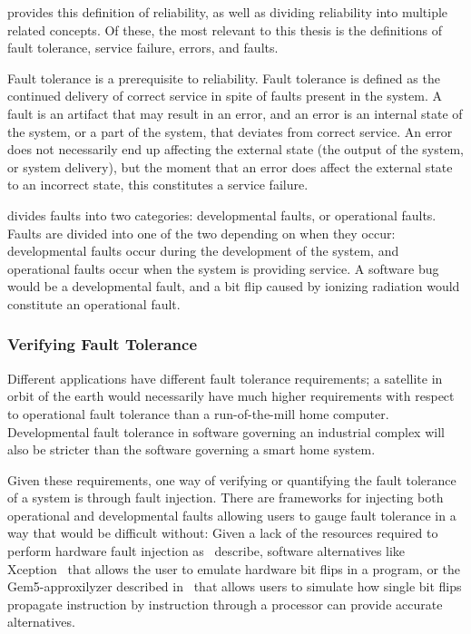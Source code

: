 \citet{avizienis2004basic} provides this definition of reliability, as well as dividing reliability into multiple related concepts. Of these, the most relevant to this thesis is the definitions of fault tolerance, service failure, errors, and faults.  

Fault tolerance is a prerequisite to reliability. Fault tolerance is defined as the continued delivery of correct service in spite of faults present in the system. A fault is an artifact that may result in an error, and an error is an internal state of the system, or a part of the system, that deviates from correct service. An error does not necessarily end up affecting the external state (the output of the system, or system delivery), but the moment that an error does affect the external state to an incorrect state, this constitutes a service failure.

\citet{avizienis2004basic} divides faults into two categories: developmental faults, or operational faults. Faults are divided into one of the two depending on when they occur: developmental faults occur during the development of the system, and operational faults occur when the system is providing service. A software bug would be a developmental fault, and a bit flip caused by ionizing radiation would constitute an operational fault.

\subsubsection{Verifying Fault Tolerance}\label{section:Verifying_fault_tolerance}

Different applications have different fault tolerance requirements; a satellite in orbit of the earth would necessarily have much higher requirements with respect to operational fault tolerance than a run-of-the-mill home computer. Developmental fault tolerance in software governing an industrial complex will also be stricter than the software governing a smart home system. 

Given these requirements, one way of verifying or quantifying the fault tolerance of a system is through fault injection. There are frameworks for injecting both operational and developmental faults allowing users to gauge fault tolerance in a way that would be difficult without: Given a lack of the resources required to perform hardware fault injection as~\citet{arlat1993fault} describe, software alternatives like Xception~\citep{carreira1998xception} that allows the user to emulate hardware bit flips in a program, or the Gem5-approxilyzer described in~\citet{venkatagiri2019gem5} that allows users to simulate how single bit flips propagate instruction by instruction through a processor can provide accurate alternatives.

